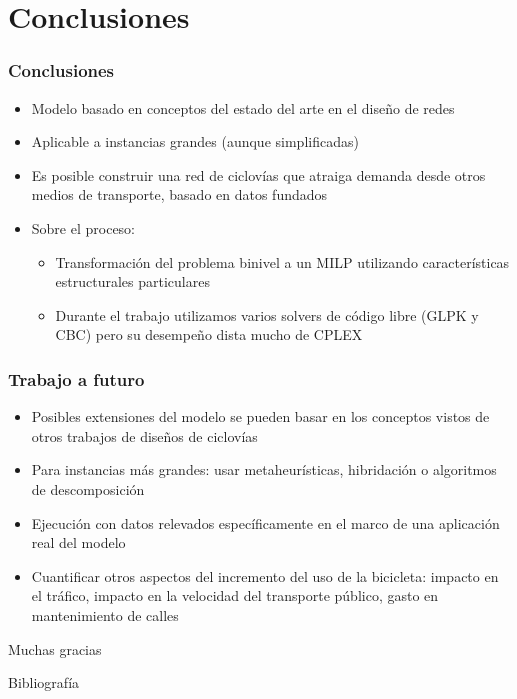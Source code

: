 \documentclass[aspectratio=43, 10pt]{beamer}
\begin{document}
\section{Conclusiones}

\begin{frame}
    \frametitle{Conclusiones}

    \begin{itemize}
        \item{Modelo basado en conceptos del estado del arte en el diseño de redes}
        \item{Aplicable a instancias grandes (aunque simplificadas)}
        \item{Es posible construir una red de ciclovías que atraiga demanda desde otros medios de transporte, basado en datos fundados}
        \item{Sobre el proceso:
            \begin{itemize}
                \item{Transformación del problema binivel a un MILP utilizando características estructurales particulares}
                \item{Durante el trabajo utilizamos varios solvers de código libre (GLPK y CBC) pero su desempeño dista mucho de CPLEX}
            \end{itemize}
        }
    \end{itemize}

\end{frame}

\begin{frame}
    \frametitle{Trabajo a futuro}

    \begin{itemize}
        \item{Posibles extensiones del modelo se pueden basar en los conceptos vistos de otros trabajos de diseños de ciclovías}
        \item{Para instancias más grandes: usar metaheurísticas, hibridación o algoritmos de descomposición}
        \item{Ejecución con datos relevados específicamente en el marco de una aplicación real del modelo}
        \item{Cuantificar otros aspectos del incremento del uso de la bicicleta:
            impacto en el tráfico,
            impacto en la velocidad del transporte público,
            gasto en mantenimiento de calles
        }
    \end{itemize}
\end{frame}

\begin{frame}[standout]
    Muchas gracias
\end{frame}

\begin{frame}{Bibliografía}
    \printbibliography[heading=none]
\end{frame}
\end{document}
